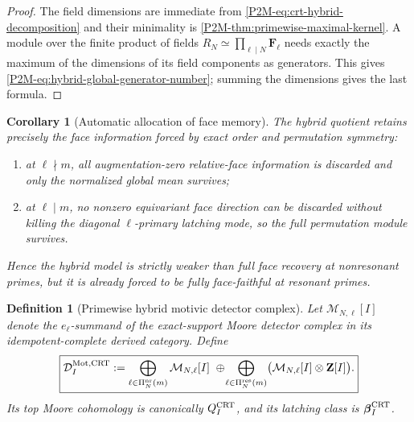 \documentclass[11pt]{article}
\newtheorem{corollary}[theorem]{Corollary}
\newtheorem{definition}[theorem]{Definition}
\theoremstyle{remark}
\newcommand{\Z}{\mathbf Z}
\newcommand{\Mot}{\mathrm{Mot}}
\begin{document}
\begin{proof}
The field dimensions are immediate from
\eqref{P2M-eq:crt-hybrid-decomposition} and their minimality is
\cref{P2M-thm:primewise-maximal-kernel}.  A module over the finite product of
fields \(R_N\simeq\prod_{\ell\mid N}\mathbf F_\ell\) needs exactly the
maximum of the dimensions of its field components as generators.  This gives
\eqref{P2M-eq:hybrid-global-generator-number}; summing the dimensions gives the
last formula.
\end{proof}

\begin{corollary}[Automatic allocation of face memory]
\label{P2M-cor:automatic-face-memory}
The hybrid quotient retains precisely the face information forced by exact
order and permutation symmetry:
\begin{enumerate}[label=\textup{(\roman*)}]
\item at \(\ell\nmid m\), all augmentation-zero relative-face information is
      discarded and only the normalized global mean survives;
\item at \(\ell\mid m\), no nonzero equivariant face direction can be
      discarded without killing the diagonal \(\ell\)-primary latching mode,
      so the full permutation module survives.
\end{enumerate}
Hence the hybrid model is strictly weaker than full face recovery at
nonresonant primes, but it is already forced to be fully face-faithful at
resonant primes.
\end{corollary}

\begin{definition}[Primewise hybrid motivic detector complex]
\label{P2M-def:primewise-hybrid-motivic-complex}
Let \(\mathcal M_{N,\ell}[I]\) denote the \(e_\ell\)-summand of the
exact-support Moore detector complex in its idempotent-complete derived
category.  Define
\begin{equation}
 \boxed{
 \mathcal D_I^{\Mot,\rm CRT}
 :=
 \bigoplus_{\ell\in\Pi_N^{\rm nr}(m)}
      \mathcal M_{N,\ell}[I]
 \ \oplus\!
 \bigoplus_{\ell\in\Pi_N^{\rm res}(m)}
      \bigl(\mathcal M_{N,\ell}[I]\otimes\Z[I]\bigr).}
\end{equation}
Its top Moore cohomology is canonically \(Q_I^{\rm CRT}\), and its latching
class is \(\boldsymbol\beta_I^{\rm CRT}\).
\end{definition}
\end{document}
